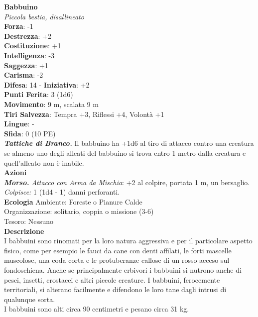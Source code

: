 \begin{multicols}{2}
\medskip\textbf{Babbuino}\\
\emph{Piccola bestia, disallineato}\\
\textbf{Forza}: -1\\
\textbf{Destrezza}: +2\\
\textbf{Costituzione}: +1\\
\textbf{Intelligenza}: -3\\
\textbf{Saggezza}: +1\\
\textbf{Carisma}: -2\\
\textbf{Difesa}: 14 - \textbf{Iniziativa}: +2\\
\textbf{Punti Ferita}: 3 (1d6)\\
\textbf{Movimento}: 9 m, scalata 9 m\\
\textbf{Tiri Salvezza}: Tempra +3, Riflessi +4, Volontà +1\\
\textbf{Lingue}: -\\
\textbf{Sfida}: 0 (10 PE)\smallskip\\
\emph{\textbf{Tattiche di Branco.}} Il babbuino ha +1d6 al tiro di attacco contro una creatura se almeno uno degli alleati del babbuino si trova entro 1 metro dalla creatura e quell'alleato non è inabile.\\
\smallskip\textbf{Azioni}\\
\emph{\textbf{Morso.} Attacco con Arma da Mischia}: +2 al colpire, portata 1 m, un bersaglio.\\
\emph{Colpisce:} 1 (1d4 - 1) danni perforanti.\\
\textbf{Ecologia}
Ambiente: Foreste o Pianure Calde\\
Organizzazione: solitario, coppia o missione (3-6)\\
Tesoro: Nessuno\\
\textbf{Descrizione}\\
I babbuini sono rinomati per la loro natura aggressiva e per il particolare aspetto fisico, come per esempio le fauci da cane con denti affilati, le forti mascelle muscolose, una coda corta e le protuberanze callose di un rosso acceso sul fondoschiena. Anche se principalmente erbivori i babbuini si nutrono anche di pesci, insetti, crostacei e altri piccole creature. I babbuini, ferocemente territoriali, si alterano facilmente e difendono le loro tane dagli intrusi di qualunque sorta.\\

I babbuini sono alti circa 90 centimetri e pesano circa 31 kg.\\


\end{multicols}

